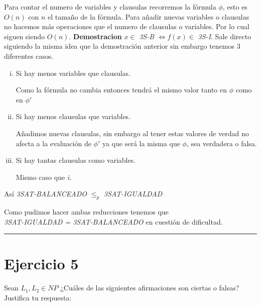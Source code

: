 \documentclass[12pt,letterpaper]{article}
\newcommand{\lineaxd}{{\color{brown}\rule{\linewidth}{0.5mm}}}
\begin{document}
\begin{itemize}
\begin{itemize}[$\heartsuit$]
    Para contar el numero de variables y clausulas recorremos la fórmula $\phi$, esto es $O(n)$ con $n$ el tamaño de la fórmula. Para añadir nuevas variables o clausulas no hacemos más operaciones que el numero de clausulas o variables. Por lo cual siguen siendo $O(n)$.
    \newpage
    \textbf{Demostracion} $x \in$ \textit{3S-B} $\Leftrightarrow f(x) \in$ \textit{3S-I}.
    Sale directo siguiendo la misma idea que la demostración anterior sin embargo tenemos 3 diferentes casos.
    \begin{enumerate}[i.]
        \item Si hay menos variables que clausulas.
        
        Como la fórmula no cambia entonces tendrá el mismo valor tanto en $\phi$ como en $\phi'$
        
        \item Si hay menos clausulas que variables.
        
        Añadimos nuevas clausulas, sin embargo al tener estas valores de verdad no afecta a la evaluación de $\phi'$ ya que será la misma que $\phi$, sea verdadera o falsa.
        
        \item Si hay tantas clausulas como variables.
        
        Mismo caso que \textit{i.}
    \end{enumerate}
    Así  \textit{3SAT-BALANCEADO} $\leq_p$ \textit{3SAT-IGUALDAD}    
    \end{itemize}
    Como pudimos hacer ambas reducciones tenemos que\\ \textit{3SAT-IGUALDAD = 3SAT-BALANCEADO} en cuestión de dificultad.
    
\end{itemize}
\lineaxd
\section*{Ejercicio 5}
Sean $L_1, L_2 \in NP$ ¿Cuáles de las siguientes afirmaciones son ciertas o falsas? Justifica tu respuesta:
\end{document}
